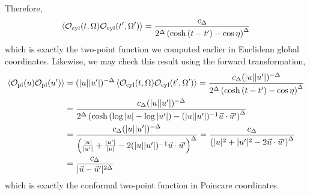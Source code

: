 \documentclass[12pt]{article}
\begin{document}
Therefore,
\[ \left< \mathcal{O}_{\text{cyl}}(t, \Omega) \mathcal{O}_{\text{cyl}}(t', \Omega') \right> = \frac{c_\Delta}{2^{\Delta} \left( \cosh{(t - t')} - \cos{\eta} \right)^\Delta} \]
which is exactly the two-point function we computed earlier in Euclidean global coordinates. Likewise, we may check this result using the forward transformation,
\begin{align*}
\left< \mathcal{O}_{\text{pl}}(u) \mathcal{O}_{\text{pl}}(u') \right> & = (|u| |u'|)^{-\Delta} \left< \mathcal{O}_{\text{cyl}}(t, \Omega) \mathcal{O}_{\text{cyl}}(t', \Omega') \right> = \frac{c_\Delta (|u| |u'|)^{-\Delta}}{2^{\Delta}  \left( \cosh{(t - t')} - \cos{\eta} \right)^\Delta}
\\
& = \frac{c_\Delta (|u| |u'|)^{-\Delta}}{2^{\Delta}  \left( \cosh{(\log{|u|} - \log{|u'|})} - (|u| |u'|)^{-1} \vec{u} \cdot \vec{u}' \right)^\Delta}
\\
& = \frac{c_\Delta (|u| |u'|)^{-\Delta}}{ \left( \frac{|u|}{|u'|} + \frac{|u'|}{|u|} - 2 (|u| |u'|)^{-1} \vec{u} \cdot \vec{u}' \right)^\Delta} = \frac{c_\Delta}{ \left( |u|^2 + |u'|^2 - 2  \vec{u} \cdot \vec{u}' \right)^\Delta}
\\
& = \frac{c_{\Delta}}{|\vec{u} - \vec{u}'|^{2 \Delta}} 
\end{align*}
which is exactly the conformal two-point function in Poincare coordinates. 

\subsection{}
\end{document}
